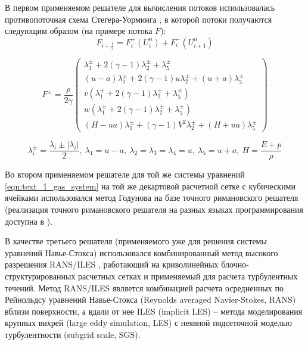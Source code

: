 В первом применяемом решателе для вычисления потоков использовалась противопоточная схема Стегера-Уорминга \cite{Smirnova2018Euler}, в которой потоки получаются следующим образом (на примере потока $F$):
\begin{equation}\label{eqn:text_1_gas_F}
	F_{i + \frac{1}{2}} = F_i^{+}(U_i^n) + F_i^{-}(U_{i + 1}^n)
\end{equation}

\begin{equation}\label{eqn:text_1_gas_F2}
	F^{\pm} = \frac{\rho}{2 \gamma}
	\begin{pmatrix}
		\lambda_1^{\pm} + 2(\gamma - 1)\lambda_2^{\pm} + \lambda_5^{\pm} \\
		(u - a)\lambda_1^{\pm} + 2(\gamma - 1)u\lambda_2^{\pm} + (u + a)\lambda_5^{\pm} \\
		v(\lambda_1^{\pm} + 2(\gamma - 1)\lambda_2^{\pm} + \lambda_5^{\pm}) \\
		w(\lambda_1^{\pm} + 2(\gamma - 1)\lambda_2^{\pm} + \lambda_5^{\pm}) \\
		(H - ua)\lambda_1^{\pm} + (\gamma - 1)V^2\lambda_2^{\pm} + (H + ua)\lambda_5^{\pm}
	\end{pmatrix}
\end{equation}

\begin{equation}
	\lambda_i^{\pm} = \frac{\lambda_i \pm |\lambda_i|}{2}, \ \lambda_1 = u - a, \ \lambda_2 = \lambda_3 = \lambda_4 = u, \ \lambda_5 = u + a, \ H = \frac{E + p}{\rho}
\end{equation}

Во втором применяемом решателе для той же системы уравнений \eqref{eqn:text_1_gas_system} на той же декартовой расчетной сетке с кубическими ячейками использовался метод Годунова \cite{Kulikovsky2001Gas} на базе точного римановского решателя \cite{Borisov2018Riemann} (реализация точного римановского решателя на разных языках программирования доступна в \cite{Toro1999Riemann,riemannvecGithub}).

В качестве третьего решателя (применяемого уже для решения системы уравнений Навье-Стокса) использовался комбинированный метод высокого разрешения RANS/ILES\label{abbr:rans-1}\label{abbr:iles-1} \cite{Bendersky2014RANSILES}, работающий на криволинейных блочно-структурированных расчетных сетках и применяемый для расчета турбулентных течений.
Метод RANS/ILES является комбинацией расчета осредненных по Рейнольдсу уравнений Навье-Стокса (Reynolds averaged Navier-Stokes, RANS) вблизи поверхности, а вдали от нее ILES (implicit LES) -- метода моделирования крупных вихрей (large eddy simulation, LES\label{abbr:les-1}) с неявной подсеточной моделью турбулентности (subgrid scale, SGS\label{abbr:sgs-1}).

